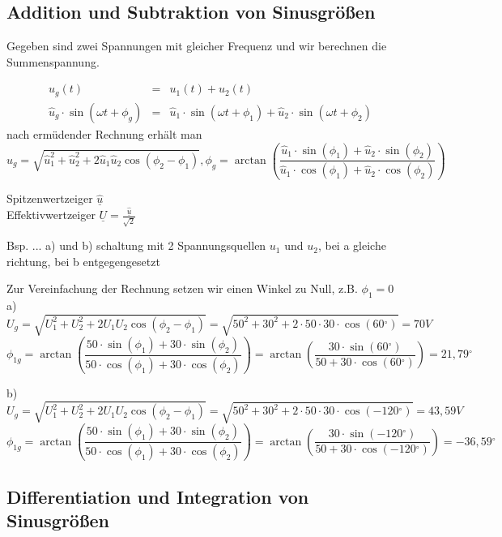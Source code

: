 \documentclass[german]{article}
\newcommand{\degree}{\ensuremath{^\circ}}
\begin{document}
\subsection{Addition und Subtraktion von Sinusgrößen}

Gegeben sind zwei Spannungen mit gleicher Frequenz und wir berechnen die Summenspannung.

\begin{eqnarray}
	u_g(t) & = & u_1(t) + u_2(t) \\
	\hat{u}_g \cdot \sin(\omega t + \phi_g) & = & \hat{u}_1 \cdot \sin(\omega t + \phi_1) + \hat{u}_2 \cdot \sin(\omega t + \phi_2)
\end{eqnarray}
nach ermüdender Rechnung erhält man
\[ \hat{u}_g = \sqrt{\hat{u}_1^2 + \hat{u}_2^2 + 2 \hat{u}_1 \hat{u}_2 \cos(\phi_2 - \phi_1)}, \phi_g = \arctan\left( \frac{\hat{u}_1 \cdot \sin(\phi_1) + \hat{u}_2 \cdot \sin(\phi_2)}{\hat{u}_1 \cdot \cos(\phi_1) + \hat{u}_2 \cdot \cos(\phi_2) } \right) \]

Spitzenwertzeiger $\underline{\hat{u}}$ \\
Effektivwertzeiger $\underline{U} = \frac{\underline{\hat{u}}}{\sqrt{2}}$

Bsp. 
...
a) und b) schaltung mit 2 Spannungsquellen $u_1$ und $u_2$, bei a gleiche richtung, bei b entgegengesetzt

Zur Vereinfachung der Rechnung setzen wir einen Winkel zu Null, z.B. $\phi_1 = 0$ \\
a) \[U_g = \sqrt{U_1^2 + U_2^2 + 2 U_1 U_2 \cos(\phi_2 - \phi_1)} = \sqrt{50^2 + 30^2 + 2 \cdot 50 \cdot 30 \cdot \cos(60\degree)} = 70V \]
\[ \phi_{1g} = \arctan\left( \frac{50 \cdot \sin(\phi_1) + 30 \cdot \sin(\phi_2)}{50 \cdot \cos(\phi_1) + 30 \cdot \cos(\phi_2)} \right) = \arctan\left( \frac{30 \cdot \sin(60\degree)}{50 + 30 \cdot \cos(60\degree)} \right) = 21,79\degree \]

b) \[U_g = \sqrt{U_1^2 + U_2^2 + 2 U_1 U_2 \cos(\phi_2 - \phi_1)} = \sqrt{50^2 + 30^2 + 2 \cdot 50 \cdot 30 \cdot \cos(-120\degree)} = 43,59V \]
\[ \phi_{1g} = \arctan\left( \frac{50 \cdot \sin(\phi_1) + 30 \cdot \sin(\phi_2)}{50 \cdot \cos(\phi_1) + 30 \cdot \cos(\phi_2)} \right) = \arctan\left( \frac{30 \cdot \sin(-120\degree)}{50 + 30 \cdot \cos(-120\degree)} \right) = -36,59\degree \]

\subsection{Differentiation und Integration von Sinusgrößen}
\end{document}

